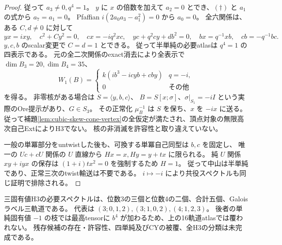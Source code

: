 \begin{proof}
従って $a_3\ne0,q^4=1$。
$y$ に $x$ の倍数を加えて $a_2=0$ とでき、$(\dagger)$ と $a_1$ の式から $a_7=a_1=0$。
Pfaffian $i(2a_0a_3-a_1^2)=0$ から $a_0=0$。
全六関係は、ある $C,d\ne0$ に対して
\[
 yx=ixy,\quad c^2+C y^2=0,\quad cx=-iq^2xc,\quad
 yc+q^2cy+d b^2=0,\quad bx=q^{-1}xb,\quad cb=-q^{-1}bc.
\]
$y,c,b$ のscalar変更で $C=d=1$ とできる。
従って半単純の必要atlasは $q^4=1$ の四表示である。
元の全二次関係のexact消去により全表示で $\dim B_3=20,\dim B_4=35$、
\[
 W_1(B)=\begin{cases}
 k(ib^3-icyb+cby)&q=-i,\\
 0&\text{その他}
 \end{cases}
\]
を得る。
非零核がある場合は $S=\langle y,b,c\rangle$、
$B=S[x;\sigma]$、$\sigma|_{S_1}=-iI$ という実際のOre提示があり、$G\in S_3$。
その正常化 $\mu_B^{-1}$ は $S$ を保ち、$x$ を $-ix$ に送る。
従って補題\ref{lem:cubic-skew-cone-vertex}の全仮定が満たされ、頂点対象の無限高次自己ExtによりH3でない。
核の非消滅を許容性と取り違えていない。

一般の単冪部分をuntwistした後も、可換する単冪自己同型は $b,c$ を固定し、
唯一の $Uc+cU$ 関係の $U$ 直線から $Hx=x,Hy=y+t x$ に限られる。
純 $U$ 関係 $xy+iyx$ の保存は $(1+i)t x^2=0$ を強制するため $H=1$。
従って中山は半単純であり、正常三次のtwist輸送は不要である。
$i\mapsto-i$ により共役スペクトルも同じ証明で排除される。
\end{proof}

\begin{corollary}[三固有値の五個の必要スペクトル]
\label{cor:cubic-three-eigenvalue-5-list}
三固有値H3の必要スペクトルは、位数3の三個と位数4の二個、合計五個、Galoisラベル三軌道である。
代表は $(3;0,1,2),(3;1,0,2),(4;1,2,3)$。
後者の単純固有値 $-1$ の枝では最高tensorに $b^4$ が加わるため、上の16軌道atlasでは覆われない。
残存候補の存在・許容性、四単純及びCYの被覆、全H3の分類は未完成である。
\end{corollary}
